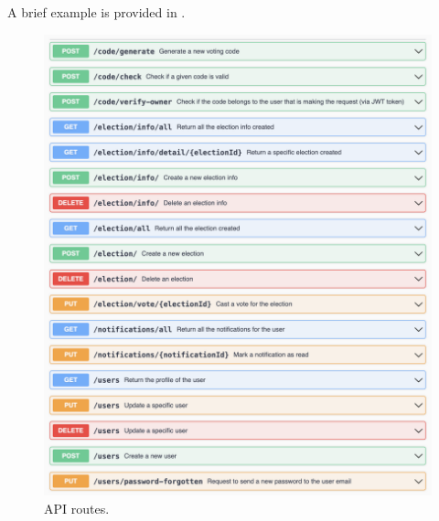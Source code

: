 \documentclass{scrartcl}
\begin{document}
A brief example is provided in .


\begin{figure}
    \centering
    \includegraphics[width=\textwidth]{./figures/backend-routes/api.png}
    \caption{API routes.}
    \label{fig:backend-routes-api}
\end{figure}
\end{document}
